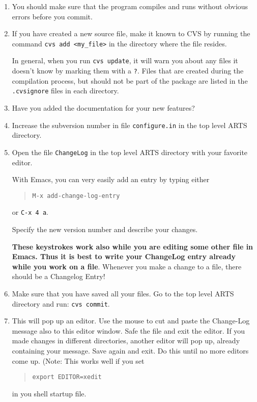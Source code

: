 \begin{enumerate}
\item You should make sure that the program compiles and runs without
  obvious errors before you commit.
\item If you have created a new source file, make it known to CVS by
  running the command \verb|cvs add <my_file>| in the directory where
  the file resides.
  
  In general, when you run \verb|cvs update|, it will warn you about
  any files it doesn't know by marking them with a \verb|?|. Files
  that are created during the compilation process, but should not be
  part of the package are listed in the \verb|.cvsignore| files in
  each directory.
\item Have you added the documentation for your new features?
\item Increase the subversion number in file \verb|configure.in| in
  the top level ARTS directory.
\item Open the file \verb|ChangeLog| in the top level ARTS directory
  with your favorite editor.
  
  With Emacs, you can very easily add an entry by typing either
  \begin{quote}
    \verb|M-x add-change-log-entry|
  \end{quote}
  or \verb|C-x 4 a|.
  
  Specify the new version number and describe your changes.

  \textbf{These keystrokes work also while you are editing some other
    file in Emacs. Thus it is best to write your ChangeLog entry
    already while you work on a file}. Whenever you make a change to a
  file, there should be a Changelog Entry!
\item Make sure that you have saved all your files. Go to the top
  level ARTS directory and run: \verb|cvs commit|.
\item This will pop up an editor. Use the mouse to cut and paste the
  Change-Log message also to this editor window. Safe the file and exit
  the editor. If you made changes in different directories, another
  editor will pop up, already containing your message. Save again and
  exit. Do this until no more editors come up. (Note: This works well
  if you set
  \begin{quote}
    \verb|export EDITOR=xedit|
  \end{quote}
  in you shell startup file.
 

\end{enumerate}
